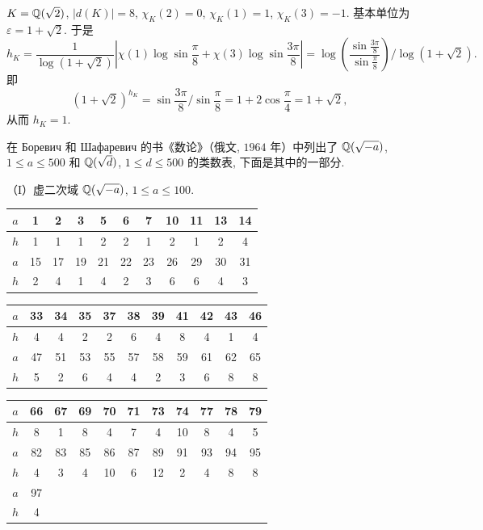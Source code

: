 \begin{example}
$K=\mathbb{Q}(\sqrt{2})$, $|d(K)|=8$, $\chi_K(2)=0$, $\chi_K(1)=1$, $\chi_K(3)=-1$. 基本单位为 $\varepsilon=1+\sqrt{2}$. 于是
\[
  h_K=\frac{1}{\log(1+\sqrt{2})}\left|\chi(1)\log\sin\frac{\pi}{8}+\chi(3)\log\sin\frac{3\pi}{8}\right|
  =\log\left(\frac{\sin\frac{3\pi}{8}}{\sin\frac{\pi}{8}}\right)\Big/\log(1+\sqrt{2}).
\]
即
\[
  (1+\sqrt{2})^{h_K}=\sin\frac{3\pi}{8}\Big/\sin\frac{\pi}{8}=1+2\cos\frac{\pi}{4}=1+\sqrt{2},
\]
从而 $h_K=1$.
\end{example}

在 Боревич 和 Шафаревич 的书《数论》（俄文, $1964$ 年）中列出了 $\mathbb{Q}(\sqrt{-a})$, $1\leqslant a\leqslant 500$ 和 $\mathbb{Q}(\sqrt{d})$, $1\leqslant d\leqslant 500$ 的类数表, 下面是其中的一部分.

（I）虚二次域 $\mathbb{Q}(\sqrt{-a})$, $1\leqslant a\leqslant 100.$

\begin{center}
\begin{tabular}{|c|cccccccccc|}
\hline
$a$ & 1 & 2 & 3 & 5 & 6 & 7 & 10 & 11 & 13 & 14 \\
\hline
$h$ & 1 & 1 & 1 & 2 & 2 & 1 & 2 & 1 & 2 & 4 \\
\hline
$a$ & 15 & 17 & 19 & 21 & 22 & 23 & 26 & 29 & 30 & 31 \\
\hline
$h$ & 2 & 4 & 1 & 4 & 2 & 3 & 6 & 6 & 4 & 3 \\
\hline
\end{tabular}
\end{center}

\begin{center}
\begin{tabular}{|c|cccccccccc|}
\hline
$a$ & 33 & 34 & 35 & 37 & 38 & 39 & 41 & 42 & 43 & 46 \\
\hline
$h$ & 4 & 4 & 2 & 2 & 6 & 4 & 8 & 4 & 1 & 4 \\
\hline
$a$ & 47 & 51 & 53 & 55 & 57 & 58 & 59 & 61 & 62 & 65 \\
\hline
$h$ & 5 & 2 & 6 & 4 & 4 & 2 & 3 & 6 & 8 & 8 \\
\hline
\end{tabular}
\end{center}

\begin{center}
\begin{tabular}{|c|cccccccccc|}
\hline
$a$ & 66 & 67 & 69 & 70 & 71 & 73 & 74 & 77 & 78 & 79 \\
\hline
$h$ & 8 & 1 & 8 & 4 & 7 & 4 & 10 & 8 & 4 & 5 \\
\hline
$a$ & 82 & 83 & 85 & 86 & 87 & 89 & 91 & 93 & 94 & 95 \\
\hline
$h$ & 4 & 3 & 4 & 10 & 6 & 12 & 2 & 4 & 8 & 8 \\
\hline
$a$ & 97 & & & & & & & & & \\
\hline
$h$ & 4 & & & & & & & & & \\
\hline
\end{tabular}
\end{center}

